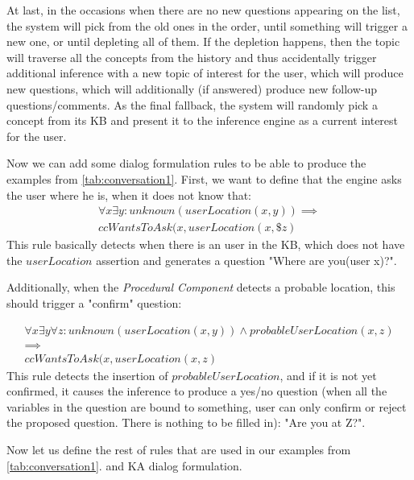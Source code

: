 At last, in the occasions when there are no new questions appearing on the list,
the system will pick from the old ones in the order, until something will 
trigger a new one, or until depleting all of them. If the depletion happens, 
then the topic will traverse all the concepts from the history and thus 
accidentally trigger additional inference with a new topic of interest for the 
user, which will produce new questions, which will additionally (if answered) 
produce new follow-up questions/comments. As the final fallback, the system 
will randomly pick a concept from its KB and present it to the inference 
engine as a current interest for the user.

Now we can add some dialog formulation rules to be able to produce the
examples from \autoref{tab:conversation1}. First, we want to define that
the engine asks the user where he is, when it does not know that:
\begin{equation}\label{rule:userLoc}
\begin{gathered}
	\forall x \exists y:unknown(userLocation(x,y)) \implies \\
	ccWantsToAsk(x,userLocation(x,\$z)
\end{gathered}
\end{equation}
This rule basically detects when there is an user in the KB, which does not have
the $userLocation$ assertion and generates a question "Where are you(user x)?".

Additionally, when the \emph{Procedural Component} detects a probable location,
this should trigger a "confirm" question:

\begin{equation}\label{rule:userLocConfirm}
\begin{gathered}
	\forall x \exists y \forall z:unknown(userLocation(x,y)) \land 
    probableUserLocation(x,z) 
    \\ \implies \\
	ccWantsToAsk(x,userLocation(x,z)
\end{gathered}
\end{equation}
This rule detects the insertion of $probableUserLocation$, and if it is not
yet confirmed, it causes the inference to produce a yes/no question (when
all the variables in the question are bound to something, user can only confirm
or reject the proposed question. There is nothing to be filled in):
"Are you at Z?".

Now let us define the rest of rules that are used in our examples 
from \autoref{tab:conversation1}. and KA dialog formulation.


